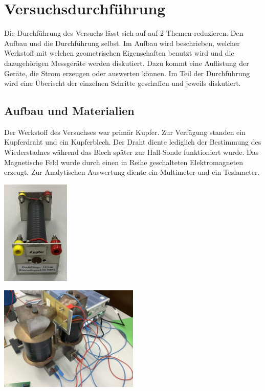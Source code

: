 \section{Versuchsdurchführung} 
\label{sec:versuchdurchführung}
Die Durchführung des Versuchs lässt sich auf auf 2 Themen reduzieren. Den Aufbau %
und die Durchführung %
selbst. Im Aufbau wird beschrieben, 
welcher Werkstoff mit welchen geometrischen Eigenschaften benutzt wird und die dazugehörigen Messgeräte werden diskutiert. Dazu kommt eine Auflistung der Geräte, die Strom erzeugen oder 
auswerten können. Im Teil der Durchführung %
wird eine Überischt der einzelnen Schritte geschaffen und jeweils diskutiert.


\subsection{Aufbau und Materialien}
\label{sec:Aufbau}
Der Werkstoff des Versuchses war primär Kupfer. Zur Verfügung standen ein Kupferdraht und ein Kupferblech. Der Draht diente lediglich der Bestimmung des Wiederstadnes während 
das Blech später zur Hall-Sonde funktioniert wurde. 
Das Magnetische Feld wurde durch einen in Reihe geschalteten Elektromagneten erzeugt. Zur Analytischen Auswertung diente ein Multimeter und ein Teslameter.\\

\vspace{1cm}
\begin{minipage}{0.5\textwidth}
\centering
\includegraphics[height=5cm]{bilder/Kupferdraht.png}
\label{fig:Kupferdraht}
\end{minipage}
\hfill
\begin{minipage}{0.49\textwidth} 
\centering
\includegraphics[height=5cm]{bilder/Magnet.png}
\label{fig:Magnet}
\end{minipage}

